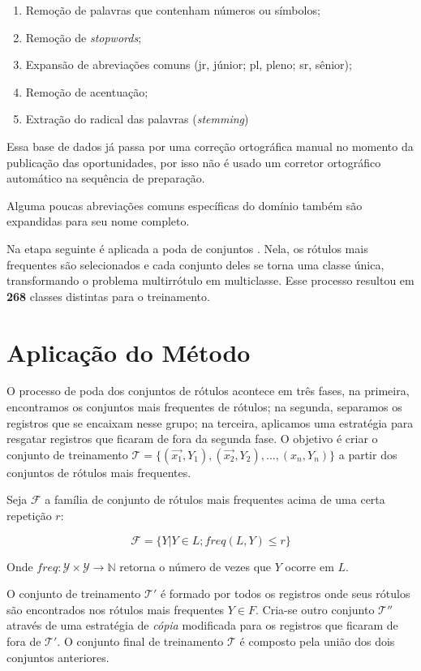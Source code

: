 \documentclass[runningheads,a4paper]{llncs}
\begin{document}
\begin{enumerate}
	\item Remoção de palavras que contenham números ou símbolos;
	\item Remoção de \textit{stopwords};
	\item Expansão de abreviações comuns (jr, júnior; pl, pleno; sr, sênior);
	\item Remoção de acentuação;
	\item Extração do radical das palavras (\textit{stemming})
\end{enumerate}

Essa base de dados já passa por uma correção ortográfica manual no momento da publicação das oportunidades, por isso não é usado um corretor ortográfico automático na sequência de preparação.

Alguma poucas abreviações comuns específicas do domínio também são expandidas para seu nome completo.

Na etapa seguinte é aplicada a poda de conjuntos \cite{Read2008-bt}. Nela, os rótulos mais frequentes são selecionados e cada conjunto deles se torna uma classe única, transformando o problema multirrótulo em multiclasse. Esse processo resultou em \textbf{268} classes distintas para o treinamento.

\section{Aplicação do Método} \label{sec:aplicacao}

O processo de poda dos conjuntos de rótulos acontece em três fases, na primeira, encontramos os conjuntos mais frequentes de rótulos; na segunda, separamos os registros que se encaixam nesse grupo; na terceira, aplicamos uma estratégia para resgatar registros que ficaram de fora da segunda fase. O objetivo é criar o conjunto de treinamento $\mathcal{T} = \{(\vec{x_1},Y_1), (\vec{x_2}, Y_2), \dots, (x_n, Y_n)\}$ a partir dos conjuntos de rótulos mais frequentes.

Seja $\mathcal{F}$ a família de conjunto de rótulos mais frequentes acima de uma certa repetição $r$:

$$
\mathcal{F} = \{Y | Y \in L; freq(L, Y) \leq r\}
$$

Onde $freq : \mathcal{Y} \times \mathcal{Y} \to \mathbb{N}$ retorna o número de vezes que $Y$ ocorre em $L$.

O conjunto de treinamento $\mathcal{T'}$ é formado por todos os registros onde seus rótulos são encontrados nos rótulos mais frequentes $Y \in F$. Cria-se outro conjunto $\mathcal{T''}$ através de uma estratégia de \textit{cópia} modificada para os registros que ficaram de fora de $\mathcal{T'}$. O conjunto final de treinamento $\mathcal{T}$ é composto pela união dos dois conjuntos anteriores.
\end{document}
